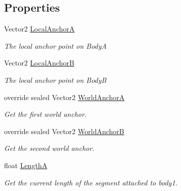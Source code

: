 \subsection*{Properties}
\begin{DoxyCompactItemize}
\item 
Vector2 \hyperlink{class_farseer_physics_1_1_dynamics_1_1_joints_1_1_pulley_joint_a754646f65deae936ba468a53a1e7082d}{Local\+Anchor\+A}
\begin{DoxyCompactList}\small\item\em The local anchor point on Body\+A \end{DoxyCompactList}\item 
Vector2 \hyperlink{class_farseer_physics_1_1_dynamics_1_1_joints_1_1_pulley_joint_a28580e4a0b597102a53a49caa729c84b}{Local\+Anchor\+B}
\begin{DoxyCompactList}\small\item\em The local anchor point on Body\+B \end{DoxyCompactList}\item 
override sealed Vector2 \hyperlink{class_farseer_physics_1_1_dynamics_1_1_joints_1_1_pulley_joint_aad8899d20a60f26ddcf1a2e1a632f443}{World\+Anchor\+A}
\begin{DoxyCompactList}\small\item\em Get the first world anchor. \end{DoxyCompactList}\item 
override sealed Vector2 \hyperlink{class_farseer_physics_1_1_dynamics_1_1_joints_1_1_pulley_joint_a32814d563ad29e17e1d517a223467d4d}{World\+Anchor\+B}
\begin{DoxyCompactList}\small\item\em Get the second world anchor. \end{DoxyCompactList}\item 
float \hyperlink{class_farseer_physics_1_1_dynamics_1_1_joints_1_1_pulley_joint_a8854194aa4a8fb4fda4b4a13d9fafdea}{Length\+A}
\begin{DoxyCompactList}\small\item\em Get the current length of the segment attached to body1. \end{DoxyCompactList}\item 

\end{DoxyCompactItemize}
